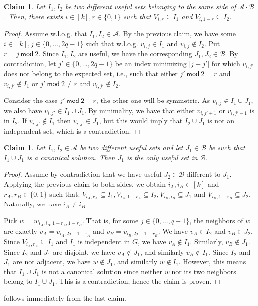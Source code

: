 \documentclass[11pt,a4paper]{article}
\newtheorem{claim}[lemma]{Claim}
\renewcommand{\mod}{\ \mathsf{mod}\ }
\newcommand{\cA}{\mathcal{A}}
\newcommand{\cB}{\mathcal{B}}
\begin{document}
\begin{claim}
    Let $I_1, I_2$ be two different useful sets belonging to the same side of $\cA \cdot \cB$. Then, there exists $i \in [k], r \in \{0,1\}$ such that $V_{i,r} \subseteq I_1$ and $V_{i, 1-r} \subseteq I_2$.
\end{claim}
\begin{proof}
    Assume w.l.o.g. that $I_1, I_2 \in \cA$.
    By the previous claim, we have some $i \in [k], j \in \{0, \dots, 2q - 1\}$ such that w.l.o.g. $v_{i,j} \in I_1$ and $v_{i,j} \not\in I_2$. Put $r = j \mod 2$. Since $I_1, I_2$ are useful, we have the corresponding $J_1, J_2 \in \cB$. By contradiction, let $j' \in \{0, \dots, 2q - 1\}$ be an index minimizing $|j - j'|$ for which $v_{i,j'}$ does not belong to the expected set, i.e., such that either $j' \mod 2 = r$ and $v_{i,j'} \not\in I_1$ or $j' \mod 2 \neq r$ and $v_{i,j'} \not\in I_2$.

    Consider the case $j' \mod 2 = r$, the other one will be symmetric. As $v_{i,j} \in I_1 \cup J_1$, we also have $v_{i,j'} \in I_1 \cup J_1$. By minimality, we have that either $v_{i,j'+1}$ or $v_{i,j'-1}$ is in $I_2$. If $v_{i,j'} \not\in I_1$ then $v_{i,j'} \in J_1$, but this would imply that $I_2 \cup J_1$ is not an independent set, which is a contradiction.
\end{proof}

\begin{claim}
    Let $I_1, I_2 \in \cA$ be two different useful sets and let $J_1 \in \cB$ be such that $I_1 \cup J_1$ is a canonical solution. Then $J_1$ is the only useful set in $\cB$.
\end{claim}
\begin{proof}
    Assume by contradiction that we have useful $J_2 \in \cB$ different to $J_1$. Applying the previous claim to both sides, we obtain $i_A, i_B \in [k]$ and $r_A, r_B \in \{0,1\}$ such that: $V_{i_A,r_A} \subseteq I_1, V_{i_A, 1 - r_A} \subseteq I_2, V_{i_B, r_B} \subseteq J_1$ and $V_{i_B, 1 - r_B} \subseteq J_2$. Naturally, we have $i_A \neq i_B$.

    Pick $w = w_{i_A, i_B, 1 - r_A, 1 - r_B}$. That is,  for some $j \in \{0, \dots, q-1\}$, the neighbors of $w$ are exactly $v_A = v_{i_A, 2j + 1 - r_A}$ and $ v_B = v_{i_B, 2j + 1 - r_B}$. We have $v_A \in I_2$ and $v_B \in J_2$. Since $V_{i_A, r_A} \subseteq I_1$ and $I_1$ is independent in $G$, we have $v_A \not\in I_1$. Similarly, $v_B \not\in J_1$. Since $I_2$ and $J_1$ are disjoint, we have $v_A \not\in J_1$, and similarly $v_B \not\in I_1$. Since $I_2$ and $J_1$ are not adjacent, we have $w \not\in J_1$, and similarly $w \not\in I_1$. However, this means that $I_1 \cup J_1$ is not a canonical solution since neither $w$ nor its two neighbors belong to $I_1 \cup J_1$. This is a contradiction, hence the claim is proven.
\end{proof}
 follows immediately from the last claim.
\end{document}
